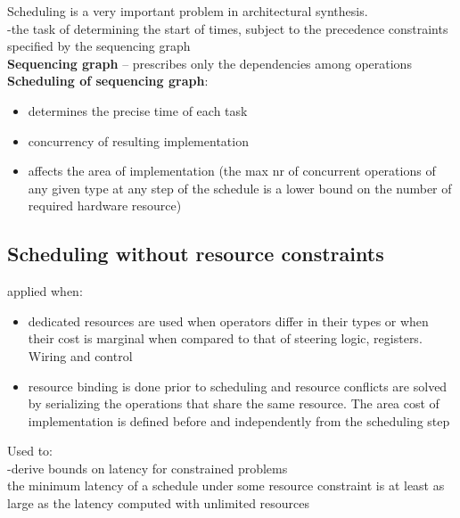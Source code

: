 \documentclass[12pt]{article}
\begin{document}
Scheduling is a very important problem in architectural synthesis.\\

-the task of determining the start of times, subject to the precedence constraints specified by the sequencing graph\\

\textbf{Sequencing graph} – prescribes only the dependencies among operations\\

\textbf{Scheduling of sequencing graph}:

\begin{itemize}

\item determines the precise time of each task
\item concurrency of resulting implementation
\item affects the area of implementation (the max nr of concurrent operations of any given type at any step of the schedule is a lower bound on the number of required hardware resource)
\end{itemize}

\subsection{Scheduling without resource constraints}

applied when:

\begin{itemize}
\item dedicated resources are used
\subitem	when operators differ in their types
\subitem 	or when their cost is marginal when compared to that of steering logic, registers. Wiring and control
\item	resource binding is done prior to scheduling and resource conflicts are solved by serializing the operations that share the same resource.
\subitem The area cost of implementation is defined before and independently from the scheduling step
\end{itemize}
Used to:\\

-derive bounds on latency for constrained problems\\

 the minimum latency of a schedule under some resource constraint is at least as large as the latency computed with unlimited resources\\
\end{document}

